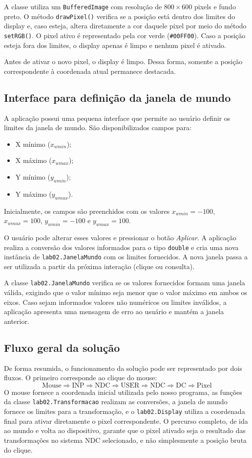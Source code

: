 A classe utiliza um \texttt{BufferedImage} com resolução de $800 \times 600$ pixels e fundo preto. O método \texttt{drawPixel()} verifica se a posição está dentro dos limites do display e, caso esteja, altera diretamente a cor daquele pixel por meio do método \texttt{setRGB()}. O pixel ativo é representado pela cor verde (\texttt{\#00FF00}). Caso a posição esteja fora dos limites, o display apenas é limpo e nenhum pixel é ativado.

Antes de ativar o novo pixel, o display é limpo. Dessa forma, somente a posição correspondente à coordenada atual permanece destacada.

\subsection{Interface para definição da janela de mundo}
A aplicação possui uma pequena interface que permite ao usuário definir os limites da janela de mundo. São disponibilizados campos para:
\begin{itemize}
    \item X mínimo ($x_{wmin}$);
    \item X máximo ($x_{wmax}$);
    \item Y mínimo ($y_{wmin}$);
    \item Y máximo ($y_{wmax}$).
\end{itemize}
Inicialmente, os campos são preenchidos com os valores $x_{wmin} = -100$, $x_{wmax} = 100$, $y_{wmin} = -100$ e $y_{wmax} = 100$.

O usuário pode alterar esses valores e pressionar o botão \textit{Aplicar}. A aplicação realiza a conversão dos valores informados para o tipo \texttt{double} e cria uma nova instância de \texttt{lab02.JanelaMundo} com os limites fornecidos. A nova janela passa a ser utilizada a partir da próxima interação (clique ou consulta).

A classe \texttt{lab02.JanelaMundo} verifica se os valores fornecidos formam uma janela válida, exigindo que o valor mínimo seja menor que o valor máximo em ambos os eixos. Caso sejam informados valores não numéricos ou limites inválidos, a aplicação apresenta uma mensagem de erro ao usuário e mantém a janela anterior.

\subsection{Fluxo geral da solução}
De forma resumida, o funcionamento da solução pode ser representado por dois fluxos. O primeiro corresponde ao clique do mouse:
\[
    \text{Mouse} \Rightarrow \text{INP} \Rightarrow \text{NDC} \Rightarrow \text{USER} \Rightarrow \text{NDC} \Rightarrow \text{DC} \Rightarrow \text{Pixel}
\]
O mouse fornece a coordenada inicial utilizada pelo nosso programa, as funções da classe \texttt{lab02.Transformacao} realizam as conversões, a janela de mundo fornece os limites para a transformação, e o \texttt{lab02.Display} utiliza a coordenada final para ativar diretamente o pixel correspondente. O percurso completo, de ida ao mundo e volta ao dispositivo, garante que o pixel ativado seja o resultado das transformações no sistema NDC selecionado, e não simplesmente a posição bruta do clique.

